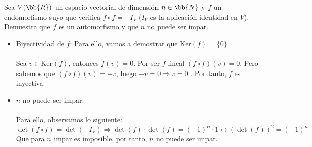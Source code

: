 \documentclass[12pt]{article}
\begin{document}
\begin{ejercicio}[2 puntos]
	Sea $V(\bb{R})$ un espacio vectorial de dimensión $n\in \bb{N}$ y $f$ un endomorfismo suyo que verifica $f\circ f=-I_V$ ($I_V$ es la aplicación identidad en $V$).
	Demuestra que $f$ es un automorfismo y que $n$ no puede ser impar.
\end{ejercicio}
\begin{itemize}
	\item Biyectividad de \( f \): Para ello, vamos a demostrar que \( \text{Ker}(f) = \{ 0 \} \). \\ \\
	      Sea \( v \in \text{Ker}(f) \), entonces \( f(v) = 0 \). Por ser $f$ lineal $(f \circ f)(v) = 0$, Pero sabemos que
	      $(f \circ f)(v) = -v$, luego $-v = 0 \Rightarrow v=0$ . Por tanto, $f$ es inyectiva.
	\item \( n \) no puede ser impar: \\ \\
	      Para ello, observamos lo siguiente:
	      \begin{equation*}
		      \det(f \circ f) = \det(-I_V) \Rightarrow \det(f) \cdot \det(f) = (-1)^n \cdot 1 \leftrightarrow (\det(f))^2 = (-1)^n
	      \end{equation*}
	      Que para $n$ impar es imposible, por tanto, $n$ no puede ser impar.
\end{itemize}
\end{document}
